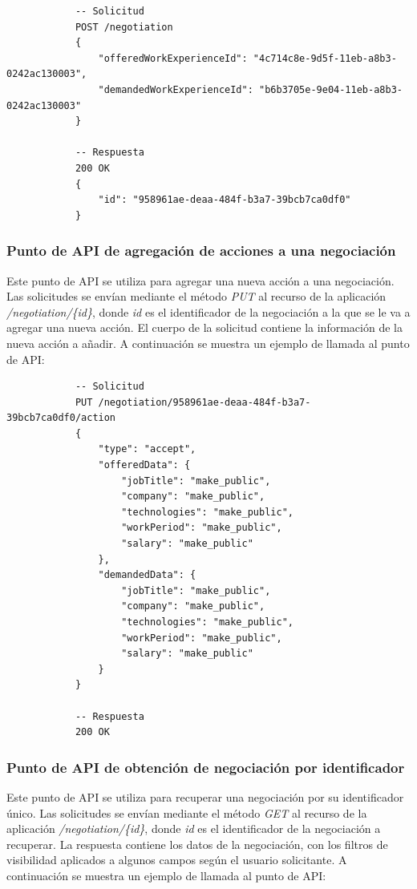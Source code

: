 \documentclass[a4paper, 12pt]{book}
\begin{document}
        {\scriptsize
    \linespread{1}
    \begin{verbatim}
			-- Solicitud
			POST /negotiation
			{
			    "offeredWorkExperienceId": "4c714c8e-9d5f-11eb-a8b3-0242ac130003",
			    "demandedWorkExperienceId": "b6b3705e-9e04-11eb-a8b3-0242ac130003"
			}

			-- Respuesta
			200 OK
			{
			    "id": "958961ae-deaa-484f-b3a7-39bcb7ca0df0"
			}
    \end{verbatim}
    }

    \subsubsection{Punto de API de agregación de acciones a una negociación}
    \label{subsec:put_negotiation}
    Este punto de API se utiliza para agregar una nueva acción a una negociación.
    Las solicitudes se envían mediante el método \emph{PUT} al recurso de la aplicación \emph{/negotiation/\{id\}}, donde \emph{id} es el identificador de la negociación a la que se le va a agregar una nueva acción.
    El cuerpo de la solicitud contiene la información de la nueva acción a añadir.
    A continuación se muestra un ejemplo de llamada al punto de API:

        {\scriptsize
    \linespread{1}
    \begin{verbatim}
			-- Solicitud
			PUT /negotiation/958961ae-deaa-484f-b3a7-39bcb7ca0df0/action
			{
			    "type": "accept",
			    "offeredData": {
			        "jobTitle": "make_public",
			        "company": "make_public",
			        "technologies": "make_public",
			        "workPeriod": "make_public",
			        "salary": "make_public"
			    },
			    "demandedData": {
			        "jobTitle": "make_public",
			        "company": "make_public",
			        "technologies": "make_public",
			        "workPeriod": "make_public",
			        "salary": "make_public"
			    }
			}

			-- Respuesta
			200 OK
    \end{verbatim}
    }

    \subsubsection{Punto de API de obtención de negociación por identificador}
    \label{subsec:get_negotiation_id}
    Este punto de API se utiliza para recuperar una negociación por su identificador único.
    Las solicitudes se envían mediante el método \emph{GET} al recurso de la aplicación \emph{/negotiation/\{id\}}, donde \emph{id} es el identificador de la negociación a recuperar.
    La respuesta contiene los datos de la negociación, con los filtros de visibilidad aplicados a algunos campos según el usuario solicitante.
    A continuación se muestra un ejemplo de llamada al punto de API:
\end{document}
